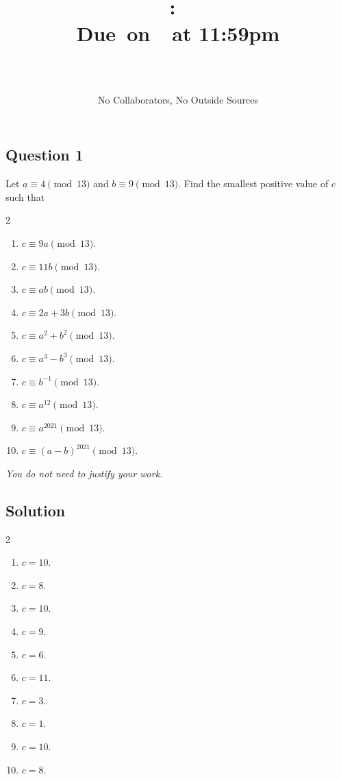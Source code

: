 \documentclass{article}
\title{
    \vspace{2in}
    \textbf{\hmwkClass:\ \hmwkTitle}\\
    \normalsize\vspace{0.1in}\small{Due\ on\ \hmwkDueDate\ at 11:59pm}\\
    \vspace{0.1in}\large{\textit{\hmwkClassInstructor}}
    \vspace{3in}
    \author{\textbf{\hmwkAuthorName} \\ \\ \small No Collaborators, No Outside Sources}
    \date{}
}
\begin{document}
\maketitle
\pagebreak

\subsection*{Question 1}
    Let $a \equiv 4 \pmod{13}$ and $b \equiv 9 \pmod{13}$. Find the smallest positive value of $c$ such that
    \begin{multicols}{2}
    \begin{enumerate}
        \item $c \equiv 9a \pmod{13}$.
        \item $c \equiv 11b \pmod{13}$.
        \item $c \equiv ab \pmod{13}$.
        \item $c \equiv 2a + 3b \pmod{13}$.
        \item $c \equiv a^{2} + b^{2} \pmod{13}$.
        \item $c \equiv a^{3} - b^{3} \pmod{13}$.
        \item $c \equiv b^{-1} \pmod{13}$.
        \item $c \equiv a^{12} \pmod{13}$.
        \item $c \equiv a^{2021} \pmod{13}$.
        \item $c \equiv (a - b)^{2021} \pmod{13}$.
    \end{enumerate}
    \end{multicols}
    \textit{You do not need to justify your work.}

\subsection*{Solution}
    \begin{multicols}{2}
    \begin{enumerate}
        \item $c = 10$.
        \item $c = 8$.
        \item $c = 10$.
        \item $c = 9$.
        \item $c = 6$.
        \item $c = 11$.
        \item $c = 3$.
        \item $c = 1$.
        \item $c = 10$.
        \item $c = 8$.
    \end{enumerate}
    \end{multicols}
\end{document}
